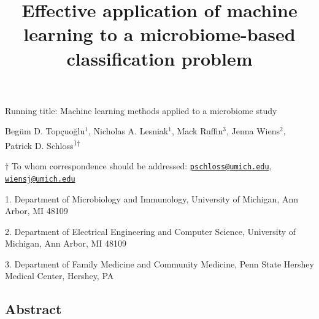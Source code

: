 \documentclass[11pt,]{article}
\title{\textbf{Effective application of machine learning to a microbiome-based
classification problem}}
\author{}
\date{\vspace{-2.5em}}
\begin{document}
\maketitle

\vspace{35mm}

Running title: Machine learning methods applied to a microbiome study

\vspace{35mm}

Begüm D. Topçuoğlu\({^1}\), Nicholas A. Lesniak\({^1}\), Mack
Ruffin\({^3}\), Jenna Wiens\({^2}\), Patrick D.
Schloss\textsuperscript{1\(\dagger\)}

\vspace{38mm}

\(\dagger\) To whom correspondence should be addressed:
\href{mailto:pschloss@umich.edu}{\nolinkurl{pschloss@umich.edu}},
\href{mailto:wiensj@umich.edu}{\nolinkurl{wiensj@umich.edu}}

1. Department of Microbiology and Immunology, University of Michigan,
Ann Arbor, MI 48109

2. Department of Electrical Engineering and Computer Science, University
of Michigan, Ann Arbor, MI 48109

3. Department of Family Medicine and Community Medicine, Penn State
Hershey Medical Center, Hershey, PA

\newpage

\linenumbers

\subsection{Abstract}\label{abstract}
\end{document}

